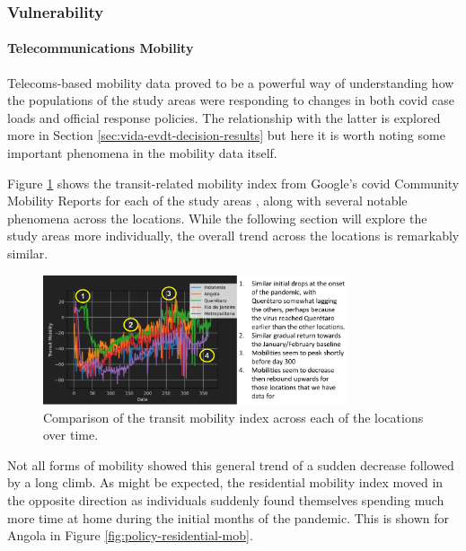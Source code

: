 \subsubsection{Vulnerability} \label{sec:vida-evdt-v-result}

\paragraph{Telecommunications Mobility} \leavevmode\newline

Telecoms-based mobility data proved to be a powerful way of understanding how the populations of the study areas were responding to changes in both \ac{covid} case loads and official response policies. The relationship with the latter is explored more in Section \ref{sec:vida-evdt-decision-results} but here it is worth noting some important phenomena in the mobility data itself.

Figure \ref{fig:transit-mobility-comparison} shows the transit-related mobility index from Google's \ac{covid} Community Mobility Reports for each of the study areas \cite{googleCOVID19CommunityMobility}, along with several notable phenomena across the locations. While the following section will explore the study areas more individually, the overall trend across the locations is remarkably similar. 

\begin{figure}[!htb]
\centering
\includegraphics[width=0.8\textwidth]{Figures/chap5/transit-mobility-comparison.png}
\caption[Transit Mobility Over Time for All Locations]{Comparison of the transit mobility index across each of the locations over time.}
\label{fig:transit-mobility-comparison}
\end{figure}

Not all forms of mobility showed this general trend of a sudden decrease followed by a long climb. As might be expected, the residential mobility index moved in the opposite direction as individuals suddenly found themselves spending much more time at home during the initial months of the pandemic. This is shown for Angola in Figure \ref{fig:policy-residential-mob}.

